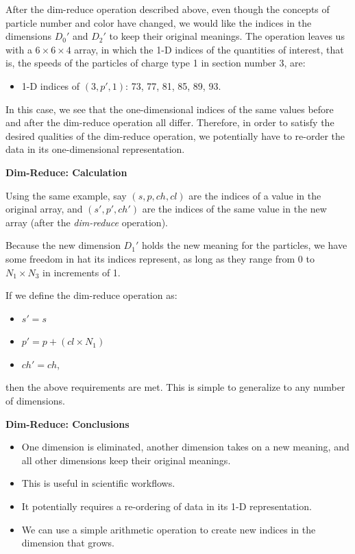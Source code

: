 \documentclass[conference]{IEEEtran}
\newcommand{\subsubsubsection}{\noindent\textbf}
\begin{document}
After the dim-reduce operation described above, even though the concepts of
particle number and color have changed, we would like the indices in the
dimensions $D_0'$ and $D_2'$ to keep their original meanings. The operation
leaves us with a $6{\times}6{\times}4$ array, in which the 1-D indices of the
quantities of interest, that is, the speeds of the particles of charge type 1
in section number 3, are:

\begin{itemize}

\item 1-D indices of $(3, p' , 1)$: 73, 77, 81, 85, 89, 93.

\end{itemize}

In this case, we see that the one-dimensional indices of the same values before
and after the dim-reduce operation all differ. Therefore, in order to satisfy
the desired qualities of the dim-reduce operation, we potentially have to
re-order the data in its one-dimensional representation.

\subsubsubsection{Dim-Reduce: Calculation}

Using the same example, say $(s, p, ch, cl)$ are the indices of a value in the
original array, and $(s', p', ch')$ are the indices of the same value in the
new array (after the {\em dim-reduce} operation).

Because the new dimension $D_1'$ holds the new meaning for the particles, we
have some freedom in hat its indices represent, as long as they range from 0 to
$N_1{\times}N_3$ in increments of 1.

If we define the dim-reduce operation as:

\begin{itemize}

\item $s' = s$

\item $p' = p + (cl{\times}N_1)$

\item $ch' = ch$,

\end{itemize}

then the above requirements are met. This is simple to generalize to any number
of dimensions.

\subsubsubsection{Dim-Reduce: Conclusions}

\begin{itemize}

\item One dimension is eliminated, another dimension takes on a new meaning, and all other dimensions keep their original meanings.

\item This is useful in scientific workflows.

\item It potentially requires a re-ordering of data in its 1-D representation.

\item We can use a simple arithmetic operation to create new indices in the
dimension that grows.

\end{itemize}
\end{document}
